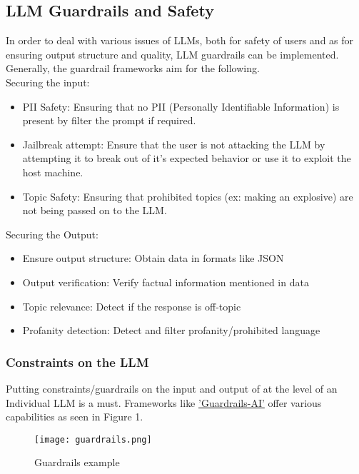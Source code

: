 \documentclass[12pt]{article}
\begin{document}
    \subsection{LLM Guardrails and Safety}

    In order to deal with various issues of LLMs, both for safety of users and as for ensuring output structure and quality, LLM guardrails can be implemented. Generally, the guardrail frameworks aim for the following.\\
    Securing the input:
    \begin{itemize}
        \item PII Safety: Ensuring that no PII (Personally Identifiable Information) is present by filter the prompt if required.
        \item Jailbreak attempt: Ensure that the user is not attacking the LLM by attempting it to break out of it's expected behavior or use it to exploit the host machine.
        \item Topic Safety: Ensuring that prohibited topics (ex: making an explosive) are not being passed on to the LLM.
    \end{itemize}
    Securing the Output:
    \begin{itemize}
        \item Ensure output structure: Obtain data in formats like JSON
        \item Output verification: Verify factual information mentioned in data
        \item Topic relevance: Detect if the response is off-topic
        \item Profanity detection: Detect and filter profanity/prohibited language
    \end{itemize}

    \subsubsection{Constraints on the LLM}
    Putting constraints/guardrails on the input and output of at the level of an Individual LLM is a must. Frameworks like \href{https://github.com/guardrails-ai/guardrails}{'Guardrails-AI'} offer various capabilities as seen in Figure 1.

    \begin{figure}[h!]
        \texttt{[image: guardrails.png]}
        \caption{Guardrails example}
        \label{fig:guardrails}
    \end{figure}
\end{document}
